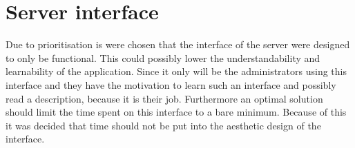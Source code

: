 \section{Server interface}\label{sec:serverInterface}
Due to prioritisation is were chosen that the interface of the server were designed to only be functional. This could possibly lower the understandability and learnability of the application. Since it only will be the administrators using this interface and they have the motivation to learn such an interface and possibly read a description, because it is their job. Furthermore an optimal solution should limit the time spent on this interface to a bare minimum. Because of this it was decided that time should not be put into the aesthetic design of the interface.